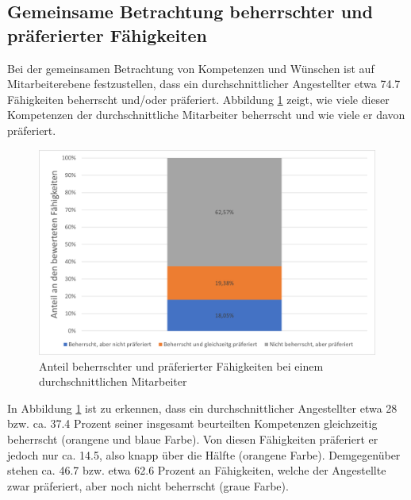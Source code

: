 \subsection{Gemeinsame Betrachtung beherrschter und präferierter Fähigkeiten}
\label{ch:ergebnisse:analyse:gemeinsam}
Bei der gemeinsamen Betrachtung von Kompetenzen und Wünschen ist auf Mitarbeiterebene festzustellen, dass ein durchschnittlicher Angestellter etwa 74.7 Fähigkeiten beherrscht und/oder präferiert. Abbildung \ref{fig:ergebnisse:analyse:abb3} zeigt, wie viele dieser Kompetenzen der durchschnittliche Mitarbeiter beherrscht und wie viele er davon präferiert.

\begin{figure}[h]
	\centering
	\includegraphics[width=1\textwidth]{gfx/auswertung-anteil-an-faehigkeiten.png}
	\caption{Anteil beherrschter und präferierter Fähigkeiten bei einem durchschnittlichen Mitarbeiter}
	\label{fig:ergebnisse:analyse:abb3}
\end{figure}

In Abbildung \ref{fig:ergebnisse:analyse:abb3} ist zu erkennen, dass ein durchschnittlicher Angestellter etwa 28 bzw. ca. 37.4 Prozent seiner insgesamt beurteilten Kompetenzen gleichzeitig beherrscht (orangene und blaue Farbe). Von diesen Fähigkeiten präferiert er jedoch nur ca. 14.5, also knapp über die Hälfte (orangene Farbe). Demgegenüber stehen ca. 46.7 bzw. etwa 62.6 Prozent an Fähigkeiten, welche der Angestellte zwar präferiert, aber noch nicht beherrscht (graue Farbe).

